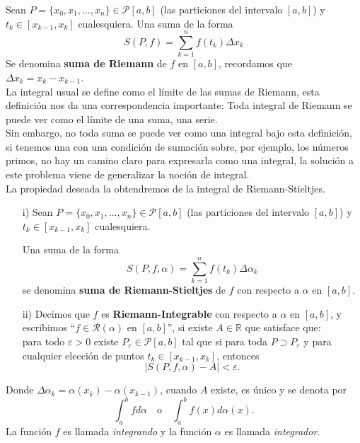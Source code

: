 Sean $P=\{x_0,x_1,...,x_n\}\in\mathcal{P}[a,b]$ (las particiones del intervalo $[a,b]$) y   $t_{k}\in [x_{k-1},x_k]$ cualesquiera. Una suma de la forma $$S(P,f)=\sum_{k=1}^{n}f(t_k)\Delta x_k$$ Se denomina \textbf{suma de Riemann} de $f$ en $[a,b]$, recordamos que $\Delta x_k=x_k-x_{k-1}$.\\

La integral usual se define como el límite de las sumas de Riemann, esta definición nos da una correspondencia importante: Toda integral de Riemann se puede ver como el límite de una suma, una serie.\\

Sin embargo, no toda suma se puede ver como una integral bajo esta definición, si tenemos una con una condición de sumación sobre, por ejemplo, los números primos, no hay un camino claro para expresarla como una integral, la solución a este problema viene de generalizar la noción de integral.\\

La propiedad deseada la obtendremos de la integral de Riemann-Stieltjes.

\begin{definition}
\phantom{uwu}
\begin{itemize}

    \item[i)] Sean $P=\{x_0,x_1,...,x_n\}\in\mathcal{P}[a,b]$ (las particiones del intervalo $[a,b]$) y   $t_{k}\in [x_{k-1},x_k]$ cualesquiera. 
    
    Una suma de la forma $$S(P,f,\alpha)=\sum_{k=1}^{n}f(t_k)\Delta \alpha_k$$ se denomina \textbf{suma de Riemann-Stieltjes} de $f$ con respecto a $\alpha$ en $[a,b]$.
    
    \item[ii)] Decimos que $f$ es \textbf{Riemann-Integrable} con respecto a $\alpha$ en $[a,b]$, y escribimos ``$f\in \mathcal{R}(\alpha)$ en $[a,b]$'', si existe $A\in \mathbb R$ que satisface que:\\ 
    para todo $\varepsilon>0$ existe $P_{\varepsilon}\in \mathcal{P}[a,b]$ tal que si para toda $P\supset P_{\varepsilon}$ y para cualquier elección de puntos $t_{k}\in [x_{k-1},x_k]$, entonces $$\mid S(P,f,\alpha) - A\mid <\varepsilon.$$
    \end{itemize}
\end{definition}

Donde $\Delta\alpha_k=\alpha(x_k)-\alpha(x_{k-1})$, cuando $A$ existe, es único y se denota por $$\int_a^b fd\alpha \quad \text{o} \quad \int_{a}^{b} f(x)d\alpha(x).$$ 
La función $f$ es llamada \textit{integrando} y la función $\alpha$ es llamada \textit{integrador}.\\


